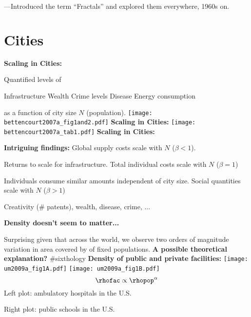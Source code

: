       ---Introduced the term ``Fractals'' and explored
      them everywhere, 1960s on.\cite{mandelbrot1967a,mandelbrot1977a,mandelbrot1983a}
\section{Cities}
  \textbf{Scaling in Cities:}
    
      Quantified levels of 
      
       Infrastructure
       Wealth
       Crime levels
       Disease
       Energy consumption
      
      as a function of city size $N$ (population).
    \texttt{[image: bettencourt2007a\_fig1and2.pdf]}
  \textbf{Scaling in Cities:}
    \texttt{[image: bettencourt2007a\_tab1.pdf]}
  \textbf{Scaling in Cities:}

  \textbf{Intriguing findings:}
      Global supply costs scale  with $N$ ($\beta<1$).
      
       Returns to scale for infrastructure.
      Total individual costs scale  with $N$ ($\beta=1$)
      
       Individuals consume similar amounts independent of city size.
      Social quantities scale  with $N$ ($\beta>1$)
      
       Creativity (\# patents), wealth, disease, crime, ...
  

  \medskip

  \textbf{Density doesn't seem to matter...}
    
     Surprising given that across the world,
      we observe two orders of magnitude variation
      in area covered by
      of fixed populations.
  \textbf{A possible theoretical explanation?}
    \bigskip
    \#sixthology
  \textbf{Density of public and private facilities:}
    \texttt{[image: um2009a\_fig1A.pdf]}
    \texttt{[image: um2009a\_fig1B.pdf]}
    $$
    \rhofac \propto \rhopop^{\alpha} 
    $$    
      \alert{Left plot:} ambulatory hospitals in the U.S.
     
      \alert{Right plot:} public schools in the U.S.
